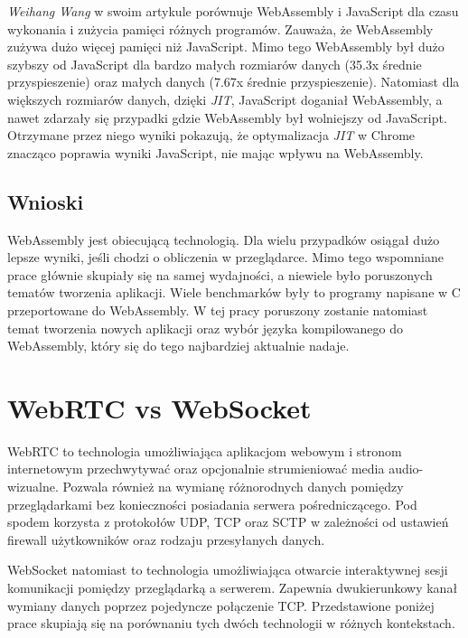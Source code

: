 \documentclass[language=polish,type=master]{aghmodern}
\begin{document}
\emph{Weihang Wang} w swoim artykule \cite{wasm_js_bench2} porównuje WebAssembly i JavaScript dla czasu wykonania i zużycia pamięci różnych programów.
Zauważa, że WebAssembly zużywa dużo więcej pamięci niż JavaScript.
Mimo tego WebAssembly był dużo szybszy od JavaScript dla bardzo małych rozmiarów danych (35.3x średnie przyspieszenie) oraz małych danych (7.67x średnie przyspieszenie).
Natomiast dla większych rozmiarów danych, dzięki \emph{JIT}\footnotemark{}, JavaScript doganiał WebAssembly, a nawet zdarzały się przypadki gdzie WebAssembly był wolniejszy od JavaScript.
Otrzymane przez niego wyniki pokazują, że optymalizacja \emph{JIT} w Chrome znacząco poprawia wyniki JavaScript, nie mając wpływu na WebAssembly.

\subsection{Wnioski}
WebAssembly jest obiecującą technologią.
Dla wielu przypadków osiągał dużo lepsze wyniki, jeśli chodzi o obliczenia w przeglądarce.
Mimo tego wspomniane prace głównie skupiały się na samej wydajności, a niewiele było poruszonych tematów tworzenia aplikacji.
Wiele benchmarków były to programy napisane w C przeportowane\footnotemark{} do WebAssembly.
W tej pracy poruszony zostanie natomiast temat tworzenia nowych aplikacji oraz wybór języka kompilowanego do WebAssembly, który się do tego najbardziej aktualnie nadaje.

\section{WebRTC vs WebSocket}
WebRTC to technologia umożliwiająca aplikacjom webowym i stronom internetowym przechwytywać oraz opcjonalnie strumieniować media audio-wizualne.
Pozwala również na wymianę różnorodnych danych pomiędzy przeglądarkami bez konieczności posiadania serwera pośredniczącego.
Pod spodem korzysta z protokołów UDP, TCP oraz SCTP w zależności od ustawień firewall użytkowników oraz rodzaju przesyłanych danych.

WebSocket natomiast to technologia umożliwiająca otwarcie interaktywnej sesji komunikacji pomiędzy przeglądarką a serwerem.
Zapewnia dwukierunkowy kanał wymiany danych poprzez pojedyncze połączenie TCP.
Przedstawione poniżej prace skupiają się na porównaniu tych dwóch technologii w różnych kontekstach.
\end{document}
